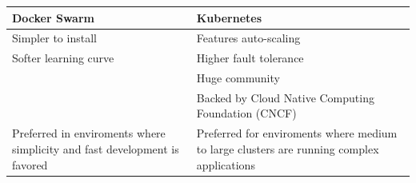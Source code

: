 \begin{table}[H]
    \centering
    \begin{tabular}{|p{15em}|p{16em}|}
        \hline
        Docker Swarm                                                              & Kubernetes                                                                                \\\hline\hline
        Simpler to install                                                        & Features auto-scaling                                                                     \\
        Softer learning curve                                                     & Higher fault tolerance                                                                    \\
                                                                                  & Huge community                                                                            \\
                                                                                  & Backed by Cloud Native Computing Foundation (CNCF)                                        \\\hline
        Preferred in enviroments where simplicity and fast development is favored & Preferred for enviroments where medium to large clusters are running complex applications \\\hline
    \end{tabular}
\end{table}
